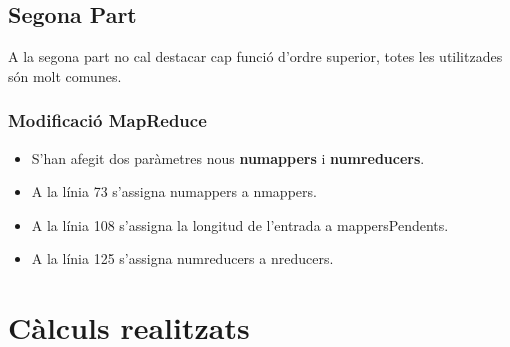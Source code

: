 \documentclass[11pt,a4paper]{article}
\begin{document}
	\subsection{Segona Part}
		A la segona part no cal destacar cap funció d'ordre superior, totes les utilitzades són molt comunes.
		
		\subsubsection{Modificació MapReduce}

			\begin{itemize}
				\item S'han afegit dos paràmetres nous \textbf{numappers} i \textbf{numreducers}.
				\item A la línia 73 s'assigna numappers a nmappers.
				\item A la línia 108 s'assigna la longitud de l'entrada a mappersPendents.
				\item A la línia 125 s'assigna numreducers a nreducers.
			\end{itemize}

\section{Càlculs realitzats}
\end{document}
